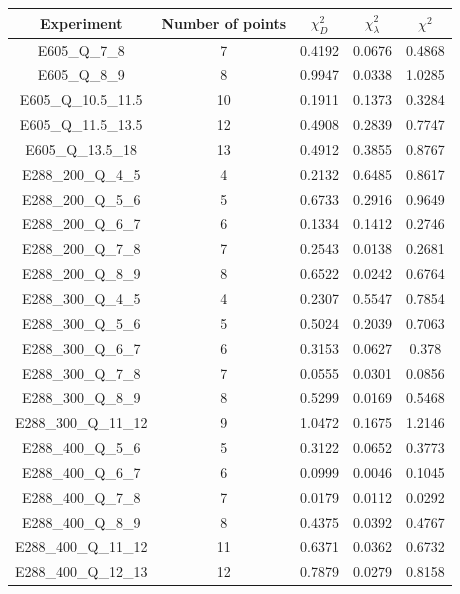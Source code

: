 \documentclass[
]{article}
\begin{document}
\begin{table}[h]

\centering

\begin{tabular}{|c|c|c|c|c|} \hline

\textbf{Experiment} & \textbf{Number of
points} & \textbf{\(\chi_{D}^2\)} & \textbf{\(\chi_{\lambda}^2\)} & \textbf{\(\chi^2\)} \\ \hline

E605\_Q\_7\_8 & 7 & 0.4192 & 0.0676 & 0.4868 \\ \hline
E605\_Q\_8\_9 & 8 & 0.9947 & 0.0338 & 1.0285 \\ \hline
E605\_Q\_10.5\_11.5 & 10 & 0.1911 & 0.1373 & 0.3284 \\ \hline
E605\_Q\_11.5\_13.5 & 12 & 0.4908 & 0.2839 & 0.7747 \\ \hline
E605\_Q\_13.5\_18 & 13 & 0.4912 & 0.3855 & 0.8767 \\ \hline
E288\_200\_Q\_4\_5 & 4 & 0.2132 & 0.6485 & 0.8617 \\ \hline
E288\_200\_Q\_5\_6 & 5 & 0.6733 & 0.2916 & 0.9649 \\ \hline
E288\_200\_Q\_6\_7 & 6 & 0.1334 & 0.1412 & 0.2746 \\ \hline
E288\_200\_Q\_7\_8 & 7 & 0.2543 & 0.0138 & 0.2681 \\ \hline
E288\_200\_Q\_8\_9 & 8 & 0.6522 & 0.0242 & 0.6764 \\ \hline
E288\_300\_Q\_4\_5 & 4 & 0.2307 & 0.5547 & 0.7854 \\ \hline
E288\_300\_Q\_5\_6 & 5 & 0.5024 & 0.2039 & 0.7063 \\ \hline
E288\_300\_Q\_6\_7 & 6 & 0.3153 & 0.0627 & 0.378 \\ \hline
E288\_300\_Q\_7\_8 & 7 & 0.0555 & 0.0301 & 0.0856 \\ \hline
E288\_300\_Q\_8\_9 & 8 & 0.5299 & 0.0169 & 0.5468 \\ \hline
E288\_300\_Q\_11\_12 & 9 & 1.0472 & 0.1675 & 1.2146 \\ \hline
E288\_400\_Q\_5\_6 & 5 & 0.3122 & 0.0652 & 0.3773 \\ \hline
E288\_400\_Q\_6\_7 & 6 & 0.0999 & 0.0046 & 0.1045 \\ \hline
E288\_400\_Q\_7\_8 & 7 & 0.0179 & 0.0112 & 0.0292 \\ \hline
E288\_400\_Q\_8\_9 & 8 & 0.4375 & 0.0392 & 0.4767 \\ \hline
E288\_400\_Q\_11\_12 & 11 & 0.6371 & 0.0362 & 0.6732 \\ \hline
E288\_400\_Q\_12\_13 & 12 & 0.7879 & 0.0279 & 0.8158 \\ \hline

\end{tabular}
\end{table}
\end{document}
